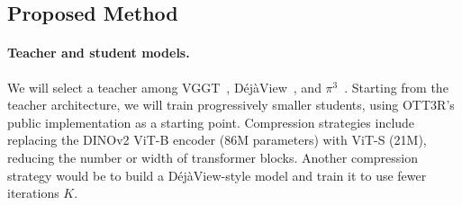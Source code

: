 \subsection{Proposed Method}

\paragraph{Teacher and student models.}
We will select a teacher among VGGT~\cite{vggt}, DéjàView~\cite{dejaview}, and $\pi^3$~\cite{pi3}. Starting from the teacher architecture, we will train progressively smaller students, using OTT3R's public implementation as a starting point. Compression strategies include replacing the DINOv2 ViT-B encoder (86M parameters) with ViT-S (21M), reducing the number or width of transformer blocks. Another compression strategy would be to build a DéjàView-style model and train it to use fewer iterations $K$.

